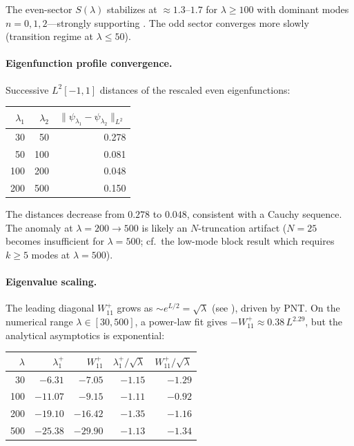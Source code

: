\documentclass[12pt,a4paper]{article}
\theoremstyle{definition}
\theoremstyle{remark}
\begin{document}
\noindent The even-sector $S(\lambda)$ stabilizes at $\approx 1.3$--$1.7$ for $\lambda \geq 100$ with dominant modes $n = 0, 1, 2$---strongly supporting . The odd sector converges more slowly (transition regime at $\lambda \leq 50$).

\paragraph{Eigenfunction profile convergence.}
Successive $L^2[-1,1]$ distances of the rescaled even eigenfunctions:

\begin{center}
\begin{tabular}{r@{${}\to{}$}r|r}
$\lambda_1$ & $\lambda_2$ & $\|\psi_{\lambda_1} - \psi_{\lambda_2}\|_{L^2}$ \\\hline
30  & 50  & 0.278 \\
50  & 100 & 0.081 \\
100 & 200 & 0.048 \\
200 & 500 & 0.150
\end{tabular}
\end{center}

\noindent The distances decrease from $0.278$ to $0.048$, consistent with a Cauchy sequence. The anomaly at $\lambda = 200 \to 500$ is likely an $N$-truncation artifact ($N = 25$ becomes insufficient for $\lambda = 500$; cf.\ the low-mode block result which requires $k \geq 5$ modes at $\lambda = 500$).

\paragraph{Eigenvalue scaling.}
The leading diagonal $W_{11}^+$ grows as $\sim e^{L/2} = \sqrt{\lambda}$ (see ), driven by PNT. On the numerical range $\lambda \in [30, 500]$, a power-law fit gives $-W_{11}^+ \approx 0.38\,L^{2.29}$, but the analytical asymptotics is exponential:

\begin{center}
\begin{tabular}{r|r|r|r|r}
$\lambda$ & $\lambda_1^+$ & $W_{11}^+$ & $\lambda_1^+ / \sqrt{\lambda}$ & $W_{11}^+ / \sqrt{\lambda}$ \\\hline
30  & $-6.31$  & $-7.05$  & $-1.15$ & $-1.29$ \\
100 & $-11.07$ & $-9.15$  & $-1.11$ & $-0.92$ \\
200 & $-19.10$ & $-16.42$ & $-1.35$ & $-1.16$ \\
500 & $-25.38$ & $-29.90$ & $-1.13$ & $-1.34$
\end{tabular}
\end{center}
\end{document}
